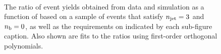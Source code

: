 \begin{figure}[h!]
\begin{center}
    \\
    \caption{The ratio of event yields obtained from data and simulation as a function of \mht [GeV] based on a sample of \mj events that satisfy $n_{\text{jet}} = 3$ and $n_{\text{b}} = 0$, as well as the requirements on \scalht indicated by each sub-figure caption. Also shown are fits to the ratios using first-order orthogonal polynomials.}
    \label{fig:mhtval_Mu_eq3j_eq0b}
  \end{center}
\end{figure}

